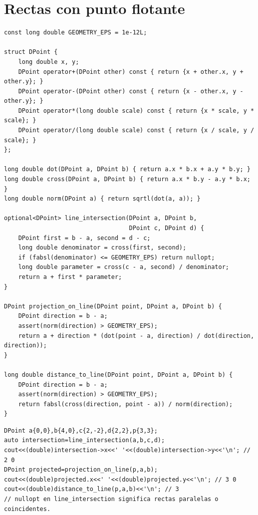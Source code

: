 \section{Rectas con punto flotante}

\begin{lstlisting}[style=cpp]
const long double GEOMETRY_EPS = 1e-12L;

struct DPoint {
    long double x, y;
    DPoint operator+(DPoint other) const { return {x + other.x, y + other.y}; }
    DPoint operator-(DPoint other) const { return {x - other.x, y - other.y}; }
    DPoint operator*(long double scale) const { return {x * scale, y * scale}; }
    DPoint operator/(long double scale) const { return {x / scale, y / scale}; }
};

long double dot(DPoint a, DPoint b) { return a.x * b.x + a.y * b.y; }
long double cross(DPoint a, DPoint b) { return a.x * b.y - a.y * b.x; }
long double norm(DPoint a) { return sqrtl(dot(a, a)); }

optional<DPoint> line_intersection(DPoint a, DPoint b,
                                   DPoint c, DPoint d) {
    DPoint first = b - a, second = d - c;
    long double denominator = cross(first, second);
    if (fabsl(denominator) <= GEOMETRY_EPS) return nullopt;
    long double parameter = cross(c - a, second) / denominator;
    return a + first * parameter;
}

DPoint projection_on_line(DPoint point, DPoint a, DPoint b) {
    DPoint direction = b - a;
    assert(norm(direction) > GEOMETRY_EPS);
    return a + direction * (dot(point - a, direction) / dot(direction, direction));
}

long double distance_to_line(DPoint point, DPoint a, DPoint b) {
    DPoint direction = b - a;
    assert(norm(direction) > GEOMETRY_EPS);
    return fabsl(cross(direction, point - a)) / norm(direction);
}
\end{lstlisting}

\begin{lstlisting}[style=cpp]
DPoint a{0,0},b{4,0},c{2,-2},d{2,2},p{3,3};
auto intersection=line_intersection(a,b,c,d);
cout<<(double)intersection->x<<' '<<(double)intersection->y<<'\n'; // 2 0
DPoint projected=projection_on_line(p,a,b);
cout<<(double)projected.x<<' '<<(double)projected.y<<'\n'; // 3 0
cout<<(double)distance_to_line(p,a,b)<<'\n'; // 3
// nullopt en line_intersection significa rectas paralelas o coincidentes.
\end{lstlisting}

